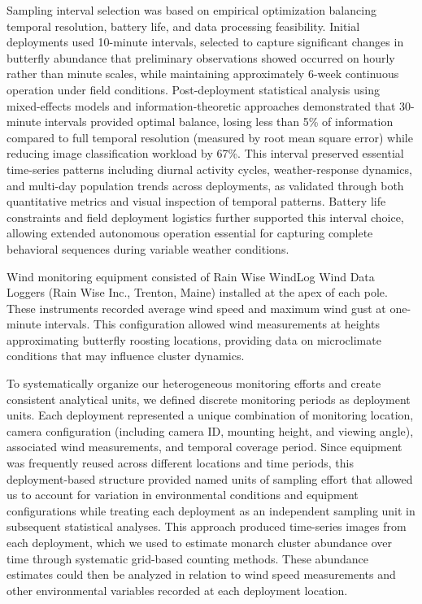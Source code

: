 Sampling interval selection was based on empirical optimization balancing temporal resolution, battery life, and data processing feasibility. Initial deployments used 10-minute intervals, selected to capture significant changes in butterfly abundance that preliminary observations showed occurred on hourly rather than minute scales, while maintaining approximately 6-week continuous operation under field conditions. Post-deployment statistical analysis using mixed-effects models and information-theoretic approaches demonstrated that 30-minute intervals provided optimal balance, losing less than 5\% of information compared to full temporal resolution (measured by root mean square error) while reducing image classification workload by 67\%. This interval preserved essential time-series patterns including diurnal activity cycles, weather-response dynamics, and multi-day population trends across deployments, as validated through both quantitative metrics and visual inspection of temporal patterns. Battery life constraints and field deployment logistics further supported this interval choice, allowing extended autonomous operation essential for capturing complete behavioral sequences during variable weather conditions.

Wind monitoring equipment consisted of Rain Wise WindLog Wind Data Loggers (Rain Wise Inc., Trenton, Maine) installed at the apex of each pole. These instruments recorded average wind speed and maximum wind gust at one-minute intervals. This configuration allowed wind measurements at heights approximating butterfly roosting locations, providing data on microclimate conditions that may influence cluster dynamics.

To systematically organize our heterogeneous monitoring efforts and create consistent analytical units, we defined discrete monitoring periods as deployment units. Each deployment represented a unique combination of monitoring location, camera configuration (including camera ID, mounting height, and viewing angle), associated wind measurements, and temporal coverage period. Since equipment was frequently reused across different locations and time periods, this deployment-based structure provided named units of sampling effort that allowed us to account for variation in environmental conditions and equipment configurations while treating each deployment as an independent sampling unit in subsequent statistical analyses. This approach produced time-series images from each deployment, which we used to estimate monarch cluster abundance over time through systematic grid-based counting methods. These abundance estimates could then be analyzed in relation to wind speed measurements and other environmental variables recorded at each deployment location.

